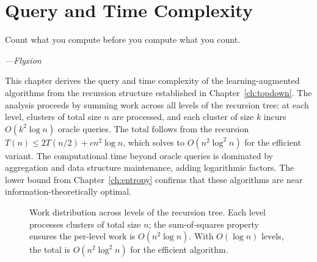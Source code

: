 \chapter{Query and Time Complexity}
\label{ch:complexity}

\epigraph{%
  Count what you compute before you compute what you count.%
}{\textit{---Flyxion}}

This chapter derives the query and time complexity of the learning-augmented algorithms from the recursion structure established in Chapter~\ref{ch:topdown}. The analysis proceeds by summing work across all levels of the recursion tree: at each level, clusters of total size $n$ are processed, and each cluster of size $k$ incurs $O(k^2\log n)$ oracle queries. The total follows from the recursion $T(n) \leq 2T(n/2) + cn^2\log n$, which solves to $O(n^2\log^2 n)$ for the efficient variant. The computational time beyond oracle queries is dominated by aggregation and data structure maintenance, adding logarithmic factors. The lower bound from Chapter~\ref{ch:entropy} confirms that these algorithms are near information-theoretically optimal.

\begin{figure}[ht]
\centering
{}
\caption{Work distribution across levels of the recursion tree. Each level processes clusters of total size $n$; the sum-of-squares property ensures the per-level work is $O(n^2\log n)$. With $O(\log n)$ levels, the total is $O(n^2\log^2 n)$ for the efficient algorithm.}
\label{fig:complexity_tree}
\end{figure}

